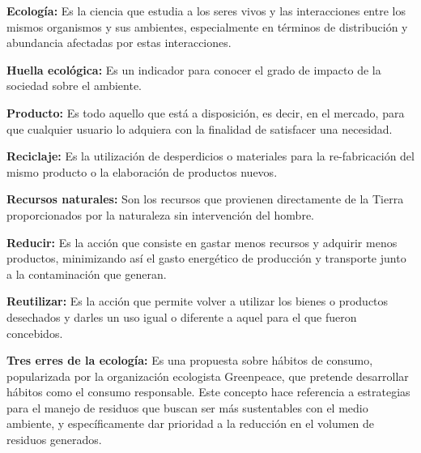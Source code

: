 \textbf{Ecología:} Es la ciencia que estudia a los seres vivos y las interacciones entre los mismos organismos y sus ambientes, especialmente en términos de distribución y abundancia afectadas por estas interacciones.

\textbf{Huella ecológica:} Es un indicador para conocer el grado de impacto de la sociedad sobre el ambiente.

\textbf{Producto:} Es todo aquello que está a disposición, es decir, en el mercado, para que cualquier usuario lo adquiera con la finalidad de satisfacer una necesidad.

\textbf{Reciclaje:} Es la utilización de desperdicios o materiales para la re-fabricación del mismo producto o la elaboración de productos nuevos.

\textbf{Recursos naturales:} Son los recursos que provienen directamente de la Tierra proporcionados por la naturaleza sin intervención del hombre.

\textbf{Reducir:} Es la acción que consiste en gastar menos recursos y adquirir menos productos, minimizando así el gasto energético de producción y transporte junto a la contaminación que generan.

\textbf{Reutilizar:} Es la acción que permite volver a utilizar los bienes o productos desechados y darles un uso igual o diferente a aquel para el que fueron concebidos.

\textbf{Tres erres de la ecología:} Es una propuesta sobre hábitos de consumo, popularizada por la organización ecologista Greenpeace, que pretende desarrollar hábitos como el consumo responsable. Este concepto hace referencia a estrategias para el manejo de residuos que buscan ser más sustentables con el medio ambiente, y específicamente dar prioridad a la reducción en el volumen de residuos generados.

\newpage
